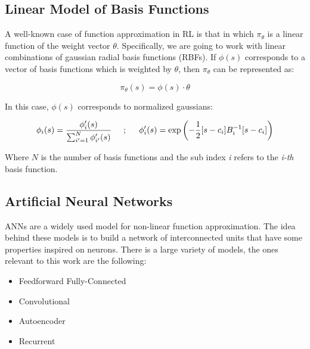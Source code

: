 \subsection[Linear Model of Basis Functions]{Linear Model of Basis Functions \cite{busoniu2010reinforcement}}
A well-known case of function approximation in RL is that in which $\pi_{\theta}$ is a linear function of
the weight vector $\theta$. Specifically, we are going to work with linear combinations of gaussian radial basis functions (RBFs). If $\phi(s)$ corresponds to a vector of basis functions which is weighted by $\theta$, then $\pi_{\theta}$ can be represented as:

\begin{equation}
    \pi_{\theta}(s) = \phi(s) \cdot \theta
    \label{eq:lcbf}
\end{equation}

In this case, $\phi(s)$ corresponds to normalized gaussians:

\begin{equation}
    \phi_{i}(s) = \frac{\phi'_{i}(s)}{\sum_{i'=1}^{N}{\phi'_{i'}(s)}}
    \hspace{0.5cm};
    \hspace{0.5cm}
    \phi'_{i}(s) = \exp\left( -\frac{1}{2}[s - c_{i}]B^{-1}_{i}[s-c_{i}]\right)
\end{equation}

\noindent Where $N$ is the number of basis functions and the sub index \emph{i} refers to the \emph{i-th} basis function.

\subsection[Artificial Neural Networks]{Artificial Neural Networks \cite{goodfellow2016deep, nielsen2015neural}}

ANNs are a widely used model for non-linear function approximation. The idea behind these models is to build a network of interconnected units that have some properties inspired on neurons. There is a large variety of models, the ones relevant to this work are the following:

\begin{itemize}
    \item Feedforward Fully-Connected
    \item Convolutional
    \item Autoencoder
    \item Recurrent
\end{itemize}

